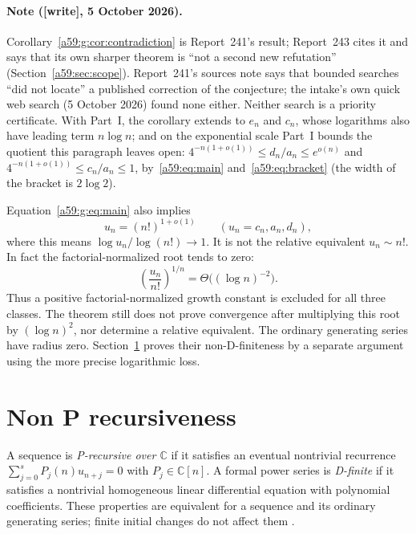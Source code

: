 \documentclass[11pt,letterpaper]{article}
\theoremstyle{remark}\newtheorem{remark}[theorem]{Remark}
\newcommand{\wtag}{\textup{[write]}}
\theoremstyle{remark}\newtheorem{wremark}{Remark}\renewcommand{\thewremark}{W\arabic{wremark}}
\theoremstyle{plain}\newtheorem{wcorollary}[wremark]{Corollary}
\begin{document}
\paragraph{Note (\wtag, 5 October 2026).} Corollary~\ref{a59:g:cor:contradiction}
is Report~241's result; Report~243 cites it and says that its own sharper
theorem is ``not a second new refutation'' (Section~\ref{a59:sec:scope}).
Report~241's sources note says that bounded searches ``did not locate'' a
published correction of the conjecture; the intake's own quick web search
(5 October 2026) found none either. Neither search is a priority
certificate. With Part~I, the corollary extends to $e_n$ and $c_n$, whose
logarithms also have leading term $n\log n$; and on the exponential scale
Part~I bounds the quotient this paragraph leaves open:
$4^{-n(1+o(1))}\le d_n/a_n\le e^{o(n)}$ and $4^{-n(1+o(1))}\le c_n/a_n\le1$,
by~\eqref{a59:eq:main} and~\eqref{a59:eq:bracket} (the width of the bracket
is $2\log2$).

Equation~\eqref{a59:g:eq:main} also implies
\[
 u_n=(n!)^{1+o(1)}\qquad(u_n=c_n,a_n,d_n),
\]
where this means $\log u_n/\log(n!)\to1$. It is not the relative equivalent $u_n\sim n!$. In fact the factorial-normalized root tends to zero:
\[
 \left(\frac{u_n}{n!}\right)^{1/n}
      =\Theta\bigl((\log n)^{-2}\bigr).
\]
Thus a positive factorial-normalized growth constant is excluded for all three classes. The theorem still does not prove convergence after multiplying this root by $(\log n)^2$, nor determine a relative equivalent. The ordinary generating series have radius zero. Section~\ref{a59:g:sec:nonholonomic} proves their non-D-finiteness by a separate argument using the more precise logarithmic loss.
\section{Non P recursiveness}\label{a59:g:sec:nonholonomic}
A sequence is \emph{P-recursive over $\mathbb C$} if it satisfies an eventual nontrivial recurrence $\sum_{j=0}^s P_j(n)u_{n+j}=0$ with $P_j\in\mathbb C[n]$. A formal power series is \emph{D-finite} if it satisfies a nontrivial homogeneous linear differential equation with polynomial coefficients. These properties are equivalent for a sequence and its ordinary generating series; finite initial changes do not affect them \cite[Theorems~1.4--1.5]{Stanley}.
\end{document}
